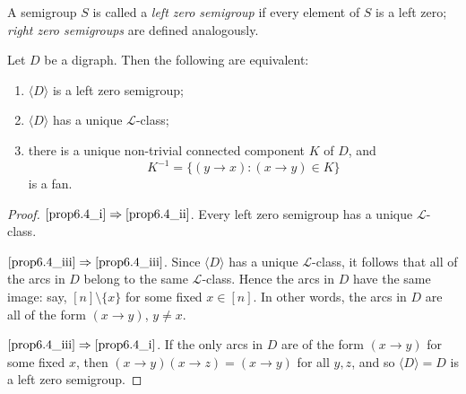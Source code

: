 \documentclass[ALCO,ThmDefs,Unicode,epreuves]{cedram}
\newcommand{\genset}[1]{\langle#1\rangle}
\newcommand{\set}[2]{\{#1:#2\}}
\newcommand{\LL}{\mathcal{L}}
\newcommand{\nset}{[n]}
\begin{document}
A semigroup $S$ is called a \emph{left zero semigroup} if every element of
$S$ is a left zero; \emph{right zero semigroups} are defined analogously.

\begin{proposition}\label{prop-left-zeros}
 Let $D$ be a digraph. Then the following are equivalent:
 \begin{enumerate} [(\roman*)]
 \item\label{prop6.4_i}
 $\genset{D}$ is a left zero semigroup;

 \item\label{prop6.4_ii}
 $\genset{D}$ has a unique $\LL$-class;

 \item\label{prop6.4_iii}
 there is a unique non-trivial connected component $K$ of $D$, and 
 \[
 K^{-1} = \set{(y\to x)}{(x\to y) \in K}
 \] 
 is a fan.
 \end{enumerate}
\end{proposition}
\begin{proof}
 $\ref{prop6.4_i}\Rightarrow\ref{prop6.4_ii}$. Every left zero semigroup has a unique
 $\LL$-class.

 $\ref{prop6.4_iii}\Rightarrow\ref{prop6.4_iii}$. 
 Since $\genset{D}$ has a unique $\LL$-class, it follows that all of the arcs
 in $D$ belong to the same $\LL$-class. Hence the arcs in $D$ have the same
 image: say, $\nset\setminus \{x\}$ for some fixed $x\in\nset$. In other words, the arcs in $D$ are all of the form $(x\to
 y)$, $y\not = x$. 

 $\ref{prop6.4_iii}\Rightarrow\ref{prop6.4_i}$. 
 If the only arcs in $D$ are of the form $(x\to y)$ for some fixed $x$, then 
 $(x \to y)(x\to z) = (x \to y)$
 for all $y, z$, and so $\genset{D}=D$ is a left zero semigroup.
\end{proof}
\end{document}
